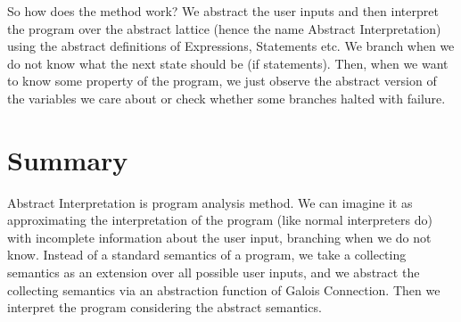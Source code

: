 So how does the method work?
We abstract the user inputs and then interpret the program over the abstract lattice (hence the name Abstract
Interpretation) using the abstract definitions of Expressions, Statements etc.
We branch when we do not know what the next state should be (if statements).
Then, when we want to know some property of the program, we just observe the abstract version of the variables we care
about or check whether some branches halted with failure.

\section*{Summary}

Abstract Interpretation is program analysis method.
We can imagine it as approximating the interpretation of the program (like normal interpreters do) with incomplete
information about the user input, branching when we do not know.
Instead of a standard semantics of a program, we take a collecting semantics as an extension over all possible user inputs,
and we abstract the collecting semantics via an abstraction function of Galois Connection.
Then we interpret the program considering the abstract semantics.
